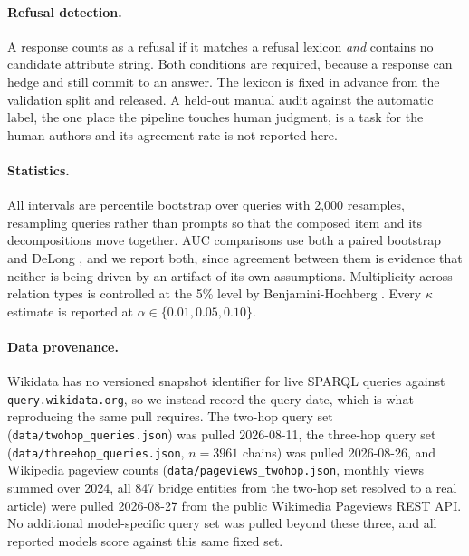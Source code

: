 \documentclass{article}
\begin{document}
\paragraph{Refusal detection.} A response counts as a refusal if it matches a refusal lexicon
\emph{and} contains no candidate attribute string. Both conditions are required, because a response
can hedge and still commit to an answer. The lexicon is fixed in advance from the validation split
and released. A held-out manual audit against the automatic label, the one place the pipeline touches
human judgment, is a task for the human authors and its agreement rate is not reported here.

\paragraph{Statistics.} All intervals are percentile bootstrap over queries with 2{,}000 resamples,
resampling queries rather than prompts so that the composed item and its decompositions move
together. AUC comparisons use both a paired bootstrap and DeLong \citep{delong1988comparing}, and we
report both, since agreement between them is evidence that neither is being driven by an artifact of
its own assumptions. Multiplicity across relation types is controlled at the 5\% level by
Benjamini-Hochberg \citep{benjamini1995controlling}. Every $\kappa$ estimate is reported at
$\alpha\in\{0.01,0.05,0.10\}$.

\paragraph{Data provenance.} Wikidata has no versioned snapshot identifier for live SPARQL queries
against \texttt{query.wikidata.org}, so we instead record the query date, which is what reproducing
the same pull requires. The two-hop query set (\texttt{data/twohop\_queries.json}) was pulled
2026-08-11, the three-hop query set (\texttt{data/threehop\_queries.json}, $n=3961$ chains) was
pulled 2026-08-26, and Wikipedia pageview counts (\texttt{data/pageviews\_twohop.json}, monthly views
summed over 2024, all 847 bridge entities from the two-hop set resolved to a real article) were
pulled 2026-08-27 from the public Wikimedia Pageviews REST API. No additional model-specific query set
was pulled beyond these three, and all reported models score against this same fixed set.

\end{document}
